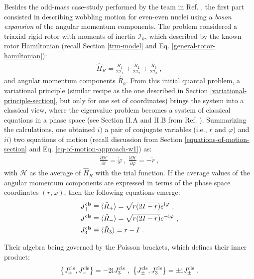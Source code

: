 Besides the odd-mass case-study performed by the team in Ref. \cite{raduta2017semiclassical}, the first part consisted in describing wobbling motion for even-even nuclei using a \emph{boson expansion} of the angular momentum components. The problem considered a triaxial rigid rotor with moments of inertia $\mathcal{I}_k$, which described by the known rotor Hamiltonian (recall Section \ref{trm-model} and Eq. \ref{general-rotor-hamiltonian}):
\begin{align}
    \hat{H}_R=\frac{\hat{R}_1}{2\mathcal{I}_1}+\frac{\hat{R}_2}{2\mathcal{I}_2}+\frac{\hat{R}_3}{2\mathcal{I}_3}\ ,
\end{align}
and angular momentum components $\hat{R}_k$. From this initial quantal problem, a variational principle (similar recipe as the one described in Section \ref{variational-principle-section}, but only for one set of coordinates) brings the system into a classical view, where the eigenvalue problem becomes a system of classical equations in a phase space (see Section II.A and II.B from Ref. \cite{raduta2017semiclassical}). Summarizing the calculations, one obtained $i)$ a pair of conjugate variables (i.e., $r$ and $\varphi$) and $ii)$ two equations of motion (recall discussion from Section \ref{equations-of-motion-section} and Eq. \ref{eq-of-motion-approach-w1}) as:
\begin{align}
    \frac{\partial\mathcal{H}}{\partial r}=\dot{\varphi}\ ,\ \frac{\partial\mathcal{H}}{\partial\varphi}=-\dot{r}\ ,
\end{align}
with $\mathcal{H}$ as the average of $\hat{H}_R$ with the trial function. If the average values of the angular momentum components are expressed in terms of the phase space coordinates $(r,\varphi)$, then the following equations emerge:
\begin{align}
    J_+^\text{cls}&\equiv\langle\hat{R}_+\rangle=\sqrt{r(2I-r)}e^{\iu\varphi}\ ,\nonumber \\
    J_-^\text{cls}&\equiv\langle\hat{R}_-\rangle=\sqrt{r(2I-r)}e^{-\iu\varphi}\ ,\nonumber \\
    J_3^\text{cls}&\equiv\langle\hat{R}_3\rangle=r-I\ .
    \label{classical-am-components-boson}
\end{align} 

Their algebra being governed by the Poisson brackets, which defines their inner product:
\begin{align}
    \left\{J_+^\text{cls},J_-^\text{cls}\right\}=-2\iu J_3^\text{cls}\ ,\ \left\{J_\pm^\text{cls},J_3^\text{cls}\right\}=\pm\iu J_{\pm}^\text{cls}\ .
    \label{classical-J-poisson-brackets}
\end{align} 

